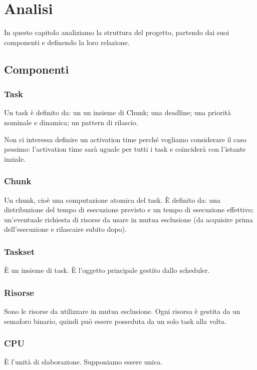 \chapter{Analisi}
In questo capitolo analiziamo la struttura del progetto, partendo dai suoi componenti e definendo la loro relazione.

\section{Componenti}

\subsection{Task}
Un task è definito da: un un insieme di Chunk; una deadline; una priorità nominale e dinamica; un pattern di rilascio.

Non ci interessa definire un activation time perché vogliamo considerare il caso pessimo: l'activation time sarà uguale per tutti i task e coinciderà con l'istante inziale.

\subsection{Chunk}
Un chunk, cioè una computazione atomica del task. È definito da: una distribuzione del tempo di esecuzione previsto e un tempo di esecuzione effettivo; un'eventuale richiesta di risorse da usare in mutua esclusione (da acquisire prima dell'esecuzione e rilascaire subito dopo).

\subsection{Taskset}
È un insieme di task. È l'oggetto principale gestito dallo scheduler.

\subsection{Risorse}
Sono le risorse da utilizzare in mutua esclusione. Ogni risorsa è gestita da un semaforo binario, quindi può essere posseduta da un solo task alla volta.

\subsection{CPU}
È l'unità di elaborazione. Supponiamo essere unica.

